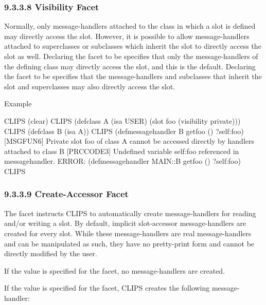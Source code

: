 \documentclass[letterpaper,10pt,english]{sphinxmanual}
\begin{document}
\subsubsection{9.3.3.8 Visibility Facet}
\label{\detokenize{cool:visibility-facet}}
Normally, only message-handlers attached to the class in which a slot is
defined may directly access the slot. However, it is possible to allow
message-handlers attached to superclasses or subclasses which inherit
the slot to directly access the slot as well. Declaring the
 facet to be  specifies that only the
message-handlers of the defining class may directly access the slot, and
this is the default. Declaring the  facet to be 
specifies that the message-handlers and subclasses that inherit the slot
and superclasses may also directly access the slot.

Example

\begin{sphinxVerbatim}[commandchars=\\\{\}]
CLIPS\PYGZgt{} (clear)
CLIPS\PYGZgt{}
(defclass A (is\PYGZhy{}a USER)
  (slot foo (visibility private)))
CLIPS\PYGZgt{}
(defclass B (is\PYGZhy{}a A))
CLIPS\PYGZgt{}
(defmessage\PYGZhy{}handler B get\PYGZhy{}foo ()
  ?self:foo)
[MSGFUN6] Private slot foo of class A cannot be accessed directly by
handlers attached to class B
[PRCCODE3] Undefined variable self:foo referenced in message\PYGZhy{}handler.
ERROR:
(defmessage\PYGZhy{}handler MAIN::B get\PYGZhy{}foo
()
?self:foo)
CLIPS\PYGZgt{}
\end{sphinxVerbatim}


\subsubsection{9.3.3.9 Create-Accessor Facet}
\label{\detokenize{cool:create-accessor-facet}}
The  facet instructs CLIPS to automatically create
 message-handlers for reading and/or writing a slot. By
default, implicit slot-accessor message-handlers are created for every
slot. While these message-handlers are real message-handlers and can be
manipulated as such, they have no pretty-print form and cannot be
directly modified by the user.

If the value  is specified for the facet, no message-handlers
are created.

If the value  is specified for the facet, CLIPS creates the
following message-handler:
\end{document}
